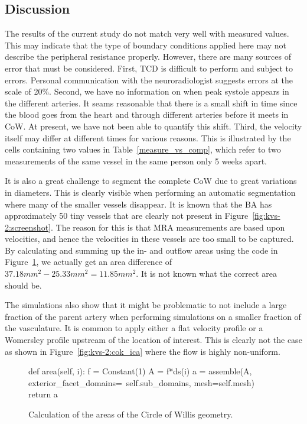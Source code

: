\subsection{Discussion}

The results of the current study do not match very well with measured
values. This may indicate that the type of boundary conditions applied
here may not describe the peripheral resistance properly. However,
there are many sources of error that must be considered.  First, TCD
is difficult to perform and subject to errors. Personal communication
with the neuroradiologist suggests errors at the scale of 20\%.
Second, we have no information on when peak systole appears in the
different arteries. It seams reasonable that there is a small shift in
time since the blood goes from the heart and through different
arteries before it meets in CoW. At present, we have not been able to
quantify this shift. Third, the velocity itself may differ at
different times for various reasons. This is illustrated by the cells
containing two values in Table~\ref{measure_vs_comp}, which refer to
two measurements of the same vessel in the same person only 5 weeks
apart.

It is also a great challenge to segment the complete CoW due to great
variations in diameters. This is clearly visible when performing an
automatic segmentation where many of the smaller vessels disappear.
It is known that the BA has approximately 50 tiny vessels that are
clearly not present in Figure~\ref{fig:kvs-2:screenshot}. The reason
for this is that MRA measurements are based upon velocities, and hence
the velocities in these vessels are too small to be captured. By
calculating and summing up the in- and outflow areas using the code in
Figure~\ref{fig:kvs-2:area_code}, we actually get an area difference
of $37.18mm^2-25.33mm^2=11.85mm^2$. It is not known what the correct
area should be.

The simulations also show that it might be problematic to not include
a large fraction of the parent artery when performing simulations on a
smaller fraction of the vasculature. It is common to apply either a
flat velocity profile or a Womersley profile upstream of the location
of interest. This is clearly not the case as shown in
Figure~\ref{fig:kvs-2:cok_ica} where the flow is highly non-uniform.

\begin{figure}
  \begin{center}
    \begin{python}
def area(self, i):
    f = Constant(1)
    A = f*ds(i)
    a = assemble(A,
                 exterior_facet_domains=\
                 self.sub_domains,
                 mesh=self.mesh)
    return a
    \end{python}
  \end{center}
    \caption{Calculation of the areas of the Circle of Willis geometry.}
    \label{fig:kvs-2:area_code}
\end{figure}

